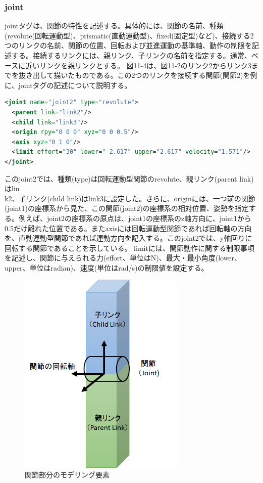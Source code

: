 \subsubsection{joint}

jointタグは、関節の特性を記述する。具体的には、関節の名前、種類(revolute(回転運動型)、prismatic(直動運動型)、fixed(固定型)など)、接続する2つのリンクの名前、関節の位置、回転および並進運動の基準軸、動作の制限を記述する。接続するリンクには、親リンク、子リンクの名前を指定する。通常、ベースに近いリンクを親リンクとする。
図11-4は、図11-2のリンク2からリンク3までを抜き出して描いたものである。この2つのリンクを接続する関節(関節2)を例に、jointタグの記述について説明する。

\begin{lstlisting}[language=XML]
<joint name="joint2" type="revolute">
  <parent link="link2"/>
  <child link="link3"/>
  <origin rpy="0 0 0" xyz="0 0 0.5"/>
  <axis xyz="0 1 0"/>
  <limit effort="30" lower="-2.617" upper="2.617" velocity="1.571"/>
</joint>
\end{lstlisting}

このjoint2では、種類(type)は回転運動型関節のrevolute、親リンク(parent link)はlin\\k2、子リンク(child link)はlink3に設定した。さらに、originには、一つ前の関節(joint1)の座標系から見た、この関節(joint2)の座標系の相対位置、姿勢を指定する。例えば、joint2の座標系の原点は、joint1の座標系のz軸方向に、joint1から0.5だけ離れた位置である。またaxisには回転運動型関節であれば回転軸の方向を、直動運動型関節であれば運動方向を記入する。このjoint2では、y軸回りに回転する関節であることを示している。 limitには、関節動作に関する制限事項を記述し、関節に与えられる力(effort、単位はN)、最大・最小角度(lower、upper、単位はradian)、速度(単位はrad/s)の制限値を設定する。

\begin{figure}[htp]
  \centering
  \includegraphics[width=8cm]{pictures/chapter11/pic_11_04.png}
  \caption{関節部分のモデリング要素}
\end{figure}

